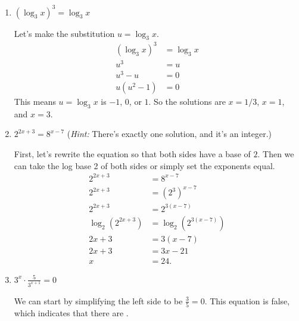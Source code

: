 \documentclass{article}
\begin{document}
\begin{enumerate}[resume]
  \begin{enumerate}

  \item
    \begin{problem}[\vfill]
      $(\log_3 x)^3 = \log_3 x$
    \end{problem}

    \begin{solution}
      Let's make the substitution $u=\log_3 x$.
      \begin{align*}
        (\log_3 x)^3 &= \log_3 x \\
        u^3 &= u \\
        u^3 - u &= 0 \\
        u(u^2 -1) &= 0
      \end{align*}
      This means $u=\log_3 x$ is $-1$, $0$, or $1$. So the solutions
      are $x=\boxed{1/3}$, $x=\boxed{1}$, and $x=\boxed{3}$.
    \end{solution}

  \item
    \begin{problem}[\vfill]
      $2^{2x + 3} = 8^{x - 7}$ (\textit{Hint:} There's exactly one
      solution, and it's an integer.)
    \end{problem}

    \begin{solution}
      First, let's rewrite the equation so that both sides have
      a base of $2$. Then we can take the log base 2 of both sides
      or simply set the exponents equal.
      \begin{align*}
          2^{2x + 3} &= 8^{x - 7} \\
          2^{2x + 3} &= (2^3)^{x - 7} \\
          2^{2x + 3} &= 2^{3(x - 7)} \\
          \log_2(2^{2x + 3}) &= \log_2(2^{3(x - 7)}) \\
          2x+3 &= 3(x-7) \\
          2x + 3 &= 3x - 21 \\
          x &= \boxed{24}.
      \end{align*}
    \end{solution}

  \item
    \begin{problem}[\nstretch{0.75}]
      $\displaystyle 3^x \cdot \frac{5}{3^{x+1}} = 0$
    \end{problem}

    \begin{solution}
      We can start by simplifying the left side to be $\frac{3}{5} = 0$.
      This equation is false, which indicates that there are 
      .
    \end{solution}


\end{enumerate}
\end{enumerate}
\end{document}
